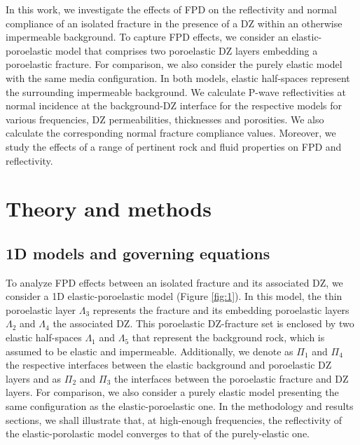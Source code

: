 \documentclass[draft]{agujournal2019}
\begin{document}
In this work, we investigate the effects of FPD on the reflectivity  and normal compliance of an isolated fracture in the  presence of a DZ within an otherwise impermeable background.
To capture FPD effects, we consider an elastic-poroelastic model that comprises two poroelastic DZ layers embedding a poroelastic fracture. 
For comparison, we also consider the purely elastic model with the same media configuration.
In both models, elastic half-spaces represent the surrounding impermeable background.
We calculate P-wave reflectivities at normal incidence at the background-DZ interface 
for the respective models for various frequencies, DZ permeabilities, thicknesses and porosities. We also calculate the corresponding normal fracture compliance values. Moreover, we study the effects of a range of pertinent rock and fluid properties on FPD and reflectivity.

\section{Theory and methods}
\subsection{1D models and governing equations}
To analyze FPD effects between an isolated fracture and its associated DZ, we consider a 1D elastic-poro\-elastic model (Figure \ref{fig:1}). In this model, the thin poro\-elastic layer $\Lambda_3$ represents the fracture and its embedding poro\-elastic layers $\Lambda_2$ and $\Lambda_4$ the associated DZ. This poroelastic DZ-fracture set is enclosed by two elastic half-spaces $\Lambda_1$ and $\Lambda_5$ that represent the  background rock, which is assumed to be elastic and impermeable.
Additionally, we denote as $\Pi_1$ and $\Pi_4$ the respective interfaces between the elastic background and poro\-elastic DZ layers and as $\Pi_2$ and $\Pi_3$ the interfaces between the poro\-elastic fracture and DZ layers. 
For comparison, we also consider a purely elastic model presenting the same configuration as the elastic-poroelastic one. In the methodology and results sections, we shall illustrate that, at high-enough frequencies, the reflectivity of the elastic-porolastic model converges to that of the purely-elastic one.
\end{document}
